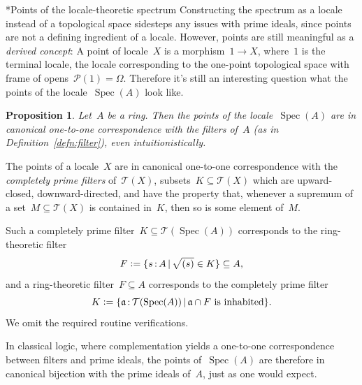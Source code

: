 \documentclass[10pt,reqno,a4paper]{amsbook}
\makeatletter
\theoremstyle{definition}
\theoremstyle{plain}
\newtheorem{prop}[defn]{Proposition}
\theoremstyle{remark}
\renewcommand{\P}{\mathcal{P}}
\newcommand{\T}{\mathcal{T}}
\newcommand{\aaa}{\mathfrak{a}}
\DeclareMathOperator{\Spec}{Spec}
\newcommand{\Open}{\T}
\newcommand{\?}{\,{:}\,}
\renewcommand{\_}{\mathpunct{.}\,}
\newcommand{\defeq}{\vcentcolon=}
\newcommand{\nocontentsline}[3]{}
\newcommand{\tocless}[1]{\let\addcontentsline=\nocontentsline}
\renewenvironment{proof}[1][\proofname]{\par
  \pushQED{\qed}%
  \normalfont \topsep6\p@\@plus6\p@\relax
  \trivlist
  \item[\hskip\labelsep
        \itshape
    #1\@addpunct{.}]\ignorespaces
}{%
  \popQED\endtrivlist\@endpefalse
}
\def\subsection{\@startsection{subsection}{2}%
  {0pt}{.5\linespacing\@plus.7\linespacing}{-.5em}%
  {\normalfont\bfseries}}
\makeatother
\begin{document}
{\tocless

\subsection*{Points of the locale-theoretic spectrum}
Constructing the spectrum as a locale instead of a topological space
sidesteps any issues with prime ideals, since points are not a defining
ingredient of a locale. However, points are still meaningful as a \emph{derived
concept}: A point of locale~$X$ is a morphism~$1 \to X$, where~$1$ is the
terminal locale, the locale corresponding to the one-point topological space
with frame of opens~$\P(1) = \Omega$.
Therefore it's still an interesting question what the points of the
locale~$\Spec(A)$ look like.

\begin{prop}\label{prop:points-spectrum}
Let~$A$ be a ring. Then the points of the locale~$\Spec(A)$ are in
canonical one-to-one correspondence with the filters of~$A$
(as in Definition~\ref{defn:filter}), even intuitionistically.\end{prop}

\begin{proof}The points of a locale~$X$ are in canonical one-to-one
correspondence with the \emph{completely prime filters} of~$\Open(X)$,
subsets~$K \subseteq \Open(X)$ which are upward-closed, downward-directed, and
have the property that, whenever a supremum of a set~$M \subseteq \Open(X)$ is
contained in~$K$, then so is some element of~$M$.

Such a completely prime filter~$K \subseteq \Open(\Spec(A))$ corresponds to the
ring-theoretic filter
\[ F \defeq \{ s \? A \,|\, \sqrt{(s)} \in K \} \subseteq A, \]
and a ring-theoretic filter~$F \subseteq A$ corresponds to the completely prime
filter
\[ K \defeq \{ \aaa \? \Open(\Spec(A)) \,|\,
  \text{$\aaa \cap F$ is inhabited} \}. \]
We omit the required routine verifications.
\end{proof}

In classical logic, where complementation yields a one-to-one correspondence
between filters and prime ideals, the points of~$\Spec(A)$ are therefore in
canonical bijection with the prime ideals of~$A$, just as one would expect.

}
\end{document}
